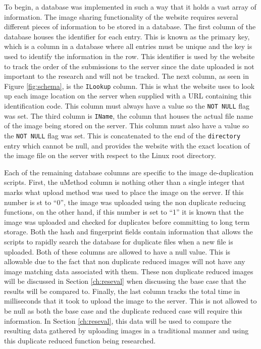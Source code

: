 To begin, a database was implemented in such a way that it holds a vast array of information. The image sharing functionality of the website requires several different pieces of information to be stored in a database. The first column of the database houses the identifier for each entry. This is known as the primary key, which is a column in a database where all entries must be unique and the key is used to identify the information in the row. This identifier is used by the website to track the order of the submissions to the server since the date uploaded is not important to the research and will not be tracked. The next column, as seen in Figure \ref{fig:schema}, is the {\tt ILookup} column. This is what the website uses to look up each image location on the server when supplied with a URL containing this identification code. This column must always have a value so the {\tt NOT NULL} flag was set. The third column is {\tt IName}, the column that houses the actual file name of the image being stored on the server. This column must also have a value so the {\tt NOT NULL} flag was set. This is concatenated to the end of the {\tt directory} entry which cannot be null, and provides the website with the exact location of the image file on the server with respect to the Linux root directory.

Each of the remaining database columns are specific to the image de-duplication scripts. First, the uMethod column is nothing other than a single integer that marks what upload method was used to place the image on the server. If this number is st to ``0'', the image was uploaded using the non duplicate reducing functions, on the other hand, if this number is set to ``1'' it is known that the image was uploaded and checked for duplicates before committing to long term storage. Both the hash and fingerprint fields contain information that allows the scripts to rapidly search the database for duplicate files when a new file is uploaded.  Both of these columns are allowed to have a null value. This is allowable due to the fact that non duplicate reduced images will not have any image matching data associated with them. These non duplicate reduced images will be discussed in Section \ref{ch:reseval} when discussing the base case that the results will be compared to. Finally, the last column tracks the total time in milliseconds that it took to upload the image to the server. This is not allowed to be null as both the base case and the duplicate reduced case will require this information. In Section \ref{ch:reseval}, this data will be used to compare the resulting data gathered by uploading images in a traditional manner and using this duplicate reduced function being researched.

